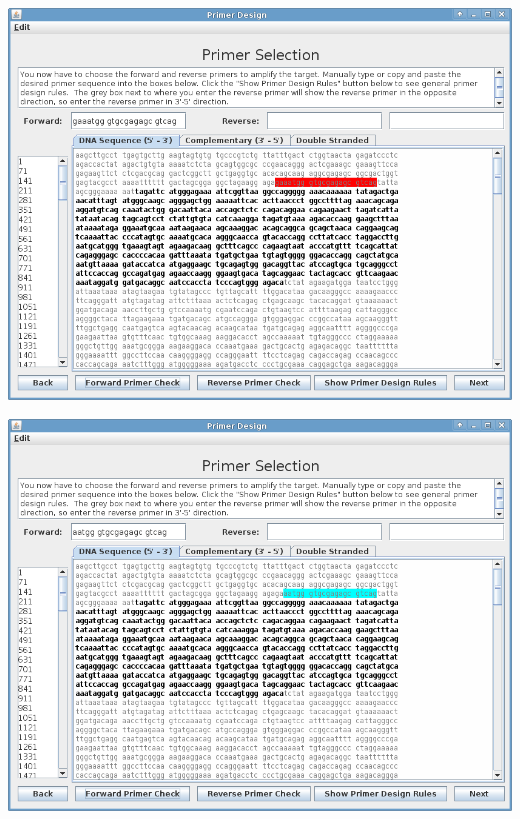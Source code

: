 \begin{frame}
  \includegraphics[width=\textwidth]
  {./img/currentBuild/forwardPrimerDesignRed.png}
\end{frame}

\begin{frame}
  \includegraphics[width=\textwidth]
  {./img/currentBuild/forwardPerfectPrimer.png}
\end{frame}

